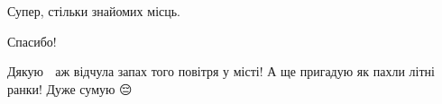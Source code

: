  
 
 
 
 

\qqSecCmt


Супер, стільки знайомих місць.


Спасибо!


Дякую 🙏 аж відчула запах того повітря у місті! А ще пригадую як пахли літні
ранки! Дуже сумую 😔
